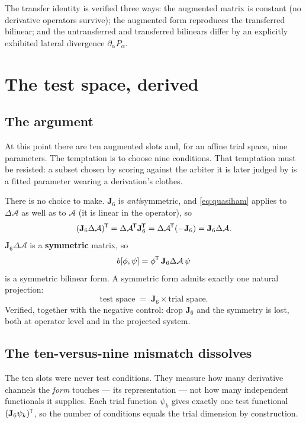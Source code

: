 \documentclass[11pt,a4paper]{article}
\newcommand{\Aop}{\mathcal{A}}
\newcommand{\dA}{\Delta\mathcal{A}}
\newcommand{\Jsix}{\mathbf{J}_{6}}
\newcommand{\tp}{^{\mkern-1.5mu\mathsf{T}}}
\begin{document}
The transfer identity is verified three ways: the augmented matrix is constant
(no derivative operators survive); the augmented form reproduces the transferred
bilinear; and the untransferred and transferred bilinears differ by an
explicitly exhibited lateral divergence $\partial_\alpha P_\alpha$.

\section{The test space, derived}\label{sec:testspace}

\subsection{The argument}

At this point there are ten augmented slots and, for an affine trial space, nine
parameters.  The temptation is to choose nine conditions.  That temptation must
be resisted: a subset chosen by scoring against the arbiter it is later judged
by is a fitted parameter wearing a derivation's clothes.

There is no choice to make.  $\Jsix$ is \emph{anti}symmetric, and
\eqref{eq:quasiham} applies to $\dA$ as well as to $\Aop$ (it is linear in the
operator), so
\begin{equation}\label{eq:symmetric}
  (\Jsix\dA)\tp = \dA\tp\Jsix\tp = \dA\tp(-\Jsix) = \Jsix\dA .
\end{equation}
$\Jsix\dA$ is a \textbf{symmetric} matrix, so
\begin{equation}
  b[\phi,\psi] = \phi\tp\,\Jsix\dA\,\psi
\end{equation}
is a symmetric bilinear form.  A symmetric form admits exactly one natural
projection:
\begin{equation}\label{eq:testspace}
  \boxed{\ \text{test space} \;=\; \Jsix \times \text{trial space}. \ }
\end{equation}
Verified, together with the negative control: drop $\Jsix$ and the symmetry is
lost, both at operator level and in the projected system.

\subsection{The ten-versus-nine mismatch dissolves}

The ten slots were never test conditions.  They measure how many derivative
channels the \emph{form} touches --- its representation --- not how many
independent functionals it supplies.  Each trial function $\psi_k$ gives exactly
one test functional $(\Jsix\psi_k)\tp$, so the number of conditions equals the
trial dimension by construction.
\end{document}
